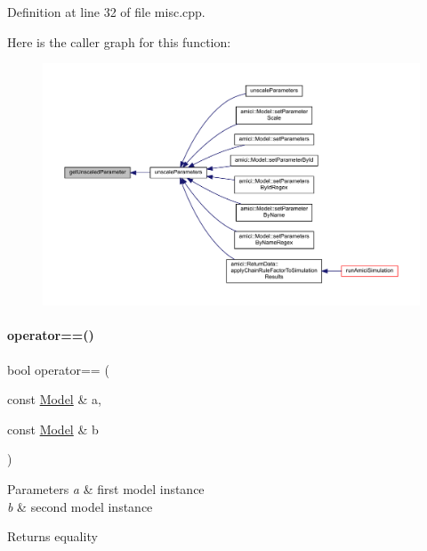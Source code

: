 Definition at line 32 of file misc.\+cpp.

Here is the caller graph for this function\+:
\nopagebreak
\begin{figure}[H]
\begin{center}
\leavevmode
\includegraphics[width=350pt]{namespaceamici_a7e1720941869974da1ca8dbd6cd9e936_icgraph}
\end{center}
\end{figure}
\mbox{\label{namespaceamici_ad5a9ae5abc63d6c24c64506c0f9aed6d}} 
\paragraph{\texorpdfstring{operator==()}{operator==()}\hspace{0.1cm}{\footnotesize\ttfamily [1/2]}}
{\footnotesize\ttfamily bool operator== (\begin{DoxyParamCaption}\item[{const \mbox{\hyperlink{classamici_1_1_model}{Model}} \&}]{a,  }\item[{const \mbox{\hyperlink{classamici_1_1_model}{Model}} \&}]{b }\end{DoxyParamCaption})}


\begin{DoxyParams}{Parameters}
{\em a} & first model instance \\
\hline
{\em b} & second model instance \\
\hline
\end{DoxyParams}
\begin{DoxyReturn}{Returns}
equality 
\end{DoxyReturn}


